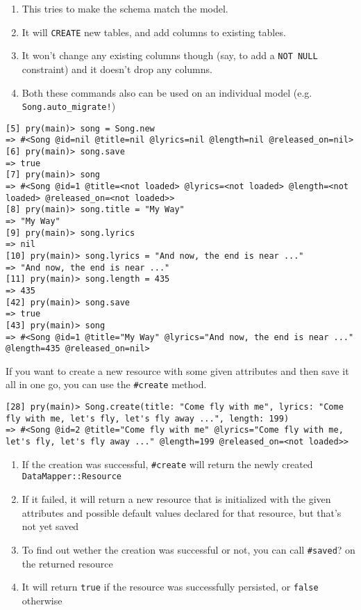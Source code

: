 \begin{enumerate}
\item 
This tries to make the schema match the model. 
\item 
It will \verb|CREATE|
new tables, and add columns to existing tables. 
\item 
It won't change any
existing columns though (say, to add a \verb|NOT NULL| constraint)
and it doesn't drop any columns. 
\item 
Both these commands also can be
used on an individual model (e.g. \verb|Song.auto_migrate!|)
\end{enumerate}

\begin{verbatim}
[5] pry(main)> song = Song.new
=> #<Song @id=nil @title=nil @lyrics=nil @length=nil @released_on=nil>
[6] pry(main)> song.save
=> true
[7] pry(main)> song
=> #<Song @id=1 @title=<not loaded> @lyrics=<not loaded> @length=<not loaded> @released_on=<not loaded>>
[8] pry(main)> song.title = "My Way"
=> "My Way"
[9] pry(main)> song.lyrics
=> nil
[10] pry(main)> song.lyrics = "And now, the end is near ..."
=> "And now, the end is near ..."
[11] pry(main)> song.length = 435
=> 435
[42] pry(main)> song.save
=> true
[43] pry(main)> song
=> #<Song @id=1 @title="My Way" @lyrics="And now, the end is near ..." @length=435 @released_on=nil>
\end{verbatim}

If you want to create a new resource with some given attributes and
then save it all in one go, you can use the \verb|#create|
method.
\begin{verbatim}
[28] pry(main)> Song.create(title: "Come fly with me", lyrics: "Come fly with me, let's fly, let's fly away ...", length: 199) 
=> #<Song @id=2 @title="Come fly with me" @lyrics="Come fly with me, let's fly, let's fly away ..." @length=199 @released_on=<not loaded>>
\end{verbatim}
\begin{enumerate}
\item 
If the creation was successful, \verb|#create| will return the newly created \verb|DataMapper::Resource|
\item  If it failed, it will return a new resource that is initialized with the given attributes and possible default values declared for that resource, but that's not yet saved
\item  To find out wether the creation was successful or not, you can call \verb|#saved|? on the returned resource
\item  It will return \verb|true| if the resource was successfully persisted, or \verb|false| otherwise
\end{enumerate}

